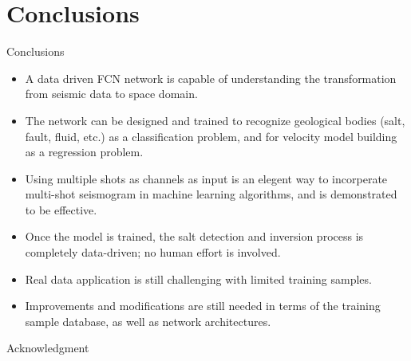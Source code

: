 \documentclass[aspectratio=169]{beamer}
\begin{document}
\section{Conclusions}
\begin{frame}{Conclusions}
\begin{itemize}
\item{A data driven FCN network is capable of understanding the transformation from seismic data to space domain.}
\item{The network can be designed and trained to recognize geological bodies (salt, fault, fluid, etc.) as a classification problem, and for velocity model building as a regression problem.}
\item{Using multiple shots as channels as input is an elegent way to incorperate multi-shot seismogram in machine learning algorithms, and is demonstrated to be effective.}
\item{Once the model is trained, the salt detection and inversion process is completely data-driven; no human effort is involved.}
\item{Real data application is still challenging with limited training samples.}
\item{Improvements and modifications are still needed in terms of the training sample database, as well as network architectures.}
\end{itemize}
\end{frame}
\begin{frame}{Acknowledgment}
\end{frame}


\end{document}
